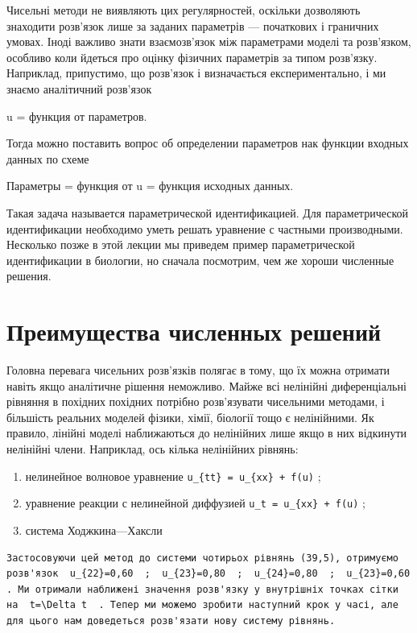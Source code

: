 \documentclass[
  ukrainian,
]{article}
\begin{document}
Чисельні методи не виявляють цих регулярностей, оскільки дозволяють
знаходити розв'язок лише за заданих параметрів --- початкових і
граничних умовах. Іноді важливо знати взаємозв'язок між параметрами
моделі та розв'язком, особливо коли йдеться про оцінку фізичних
параметрів за типом розв'язку. Наприклад, припустимо, що розв'язок і
визначається експериментально, і ми знаємо аналітичний розв'язок

u = функция от параметров.

Тогда можно поставить вопрос об определении параметров нак функции
входных данных по схеме

Параметры = функция от u = функция исходных данных.

Такая задача называется параметрической идентификацией. Для
параметрической идентификации необходимо уметь решать уравнение с
частными производными. Несколько позже в этой лекции мы приведем пример
параметрической идентификации в биологии, но сначала посмотрим, чем же
хороши численные решения.

\section{Преимущества численных
решений}\label{ux43fux440ux435ux438ux43cux443ux449ux435ux441ux442ux432ux430-ux447ux438ux441ux43bux435ux43dux43dux44bux445-ux440ux435ux448ux435ux43dux438ux439}

Головна перевага чисельних розв'язків полягає в тому, що їх можна
отримати навіть якщо аналітичне рішення неможливо. Майже всі нелінійні
диференціальні рівняння в похідних похідних потрібно розв'язувати
чисельними методами, і більшість реальних моделей фізики, хімії,
біології тощо є нелінійними. Як правило, лінійні моделі наближаються до
нелінійних лише якщо в них відкинути нелінійні члени. Наприклад, ось
кілька нелінійних рівнянь:

\begin{enumerate}
\def\labelenumi{\arabic{enumi})}
\item
  нелинейное волновое уравнение
  \texttt{u\_\{tt\}\ =\ u\_\{xx\}\ +\ f(u)} ;
\item
  уравнение реакции с нелинейной диффузией
  \texttt{u\_t\ =\ u\_\{xx\}\ +\ f(u)} ;
\item
  система Ходжкина---Хаксли
\end{enumerate}

\begin{verbatim}
Застосовуючи цей метод до системи чотирьох рівнянь (39,5), отримуємо розв'язок  u_{22}=0,60  ;  u_{23}=0,80  ;  u_{24}=0,80  ;  u_{23}=0,60  . Ми отримали наближені значення розв'язку у внутрішніх точках сітки на  t=\Delta t  . Тепер ми можемо зробити наступний крок у часі, але для цього нам доведеться розв'язати нову систему рівнянь.
\end{verbatim}
\end{document}
